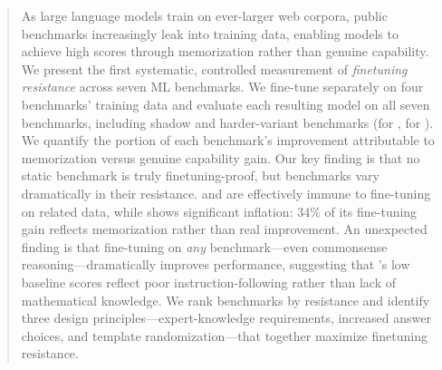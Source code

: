 \begin{abstract}
As large language models train on ever-larger web corpora, public benchmarks increasingly leak into training data, enabling models to achieve high scores through memorization rather than genuine capability. We present the first systematic, controlled measurement of \emph{finetuning resistance} across seven ML benchmarks. We fine-tune \qwen separately on four benchmarks' training data and evaluate each resulting model on all seven benchmarks, including shadow and harder-variant benchmarks (\gsmsym for \gsmk, \mmlupro for \mmlu). We quantify the portion of each benchmark's improvement attributable to memorization versus genuine capability gain. Our key finding is that no static benchmark is truly finetuning-proof, but benchmarks vary dramatically in their resistance. \gpqa and \mmlupro are effectively immune to fine-tuning on related data, while \gsmk shows significant inflation: 34\% of its fine-tuning gain reflects memorization rather than real improvement. An unexpected finding is that fine-tuning on \emph{any} benchmark---even commonsense reasoning---dramatically improves \gsmk performance, suggesting that \gsmk's low baseline scores reflect poor instruction-following rather than lack of mathematical knowledge. We rank benchmarks by resistance and identify three design principles---expert-knowledge requirements, increased answer choices, and template randomization---that together maximize finetuning resistance.
\end{abstract}
